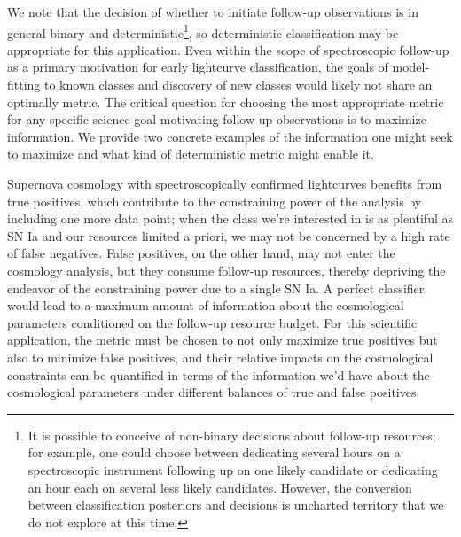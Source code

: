 We note that the decision of whether to initiate follow-up observations is in general binary and deterministic\footnote{It is possible to conceive of non-binary decisions about follow-up resources; for example, one could choose between dedicating several hours on a spectroscopic instrument following up on one likely candidate or dedicating an hour each on several less likely candidates.  However, the conversion between classification posteriors and decisions is uncharted territory that we do not explore at this time.}, so deterministic classification may be appropriate for this application.
Even within the scope of spectroscopic follow-up as a primary motivation for early lightcurve classification, the goals of model-fitting to known classes and discovery of new classes would likely not share an optimally metric.
The critical question for choosing the most appropriate metric for any specific science goal motivating follow-up observations is to maximize information.
We provide two concrete examples of the information one might seek to maximize and what kind of deterministic metric might enable it.

Supernova cosmology with spectroscopically confirmed lightcurves benefits from true positives, which contribute to the constraining power of the analysis by including one more data point; when the class we're interested in is as plentiful as SN Ia and our resources limited a priori, we may not be concerned by a high rate of false negatives.
False positives, on the other hand, may not enter the cosmology analysis, but they consume follow-up resources, thereby depriving the endeavor of the constraining power due to a single SN Ia.
A perfect classifier would lead to a maximum amount of information about the cosmological parameters conditioned on the follow-up resource budget.
For this scientific application, the metric must be chosen to not only maximize true positives but also to minimize false positives, and their relative impacts on the cosmological constraints can be quantified in terms of the information we'd have about the cosmological parameters under different balances of true and false positives.

